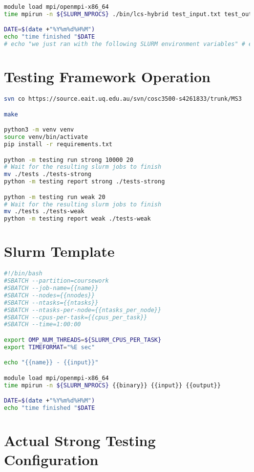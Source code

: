 \begin{appendices}
\begin{lstlisting}[language=bash, caption=Slurm Script (go.sh), captionpos=b]
module load mpi/openmpi-x86_64
time mpirun -n ${SLURM_NPROCS} ./bin/lcs-hybrid test_input.txt test_output.txt

DATE=$(date +"%Y%m%d%H%M")
echo "time finished "$DATE
# echo "we just ran with the following SLURM environment variables" # env | grep SLURM
\end{lstlisting}


\chapter{Testing Framework Operation}
\label{app:framework}
\begin{lstlisting}[language=bash, caption=Testing Framework Operation, captionpos=b]
svn co https://source.eait.uq.edu.au/svn/cosc3500-s4261833/trunk/MS3

make

python3 -m venv venv
source venv/bin/activate
pip install -r requirements.txt

python -m testing run strong 10000 20
# Wait for the resulting slurm jobs to finish
mv ./tests ./tests-strong
python -m testing report strong ./tests-strong

python -m testing run weak 20
# Wait for the resulting slurm jobs to finish
mv ./tests ./tests-weak
python -m testing report weak ./tests-weak
\end{lstlisting}


\chapter{Slurm Template}
\label{app:template}
\begin{lstlisting}[language=bash, caption=Slurm Template (template.sh), captionpos=b]
#!/bin/bash
#SBATCH --partition=coursework
#SBATCH --job-name={{name}}
#SBATCH --nodes={{nnodes}}
#SBATCH --ntasks={{ntasks}}
#SBATCH --ntasks-per-node={{ntasks_per_node}}
#SBATCH --cpus-per-task={{cpus_per_task}}
#SBATCH --time=1:00:00

export OMP_NUM_THREADS=${SLURM_CPUS_PER_TASK}
export TIMEFORMAT="%E sec"

echo "{{name}} - {{input}}"

module load mpi/openmpi-x86_64
time mpirun -n ${SLURM_NPROCS} {{binary}} {{input}} {{output}}

DATE=$(date +"%Y%m%d%H%M")
echo "time finished "$DATE
\end{lstlisting}

\chapter{Actual Strong Testing Configuration}
\label{app:actual-strong}


\end{appendices}
